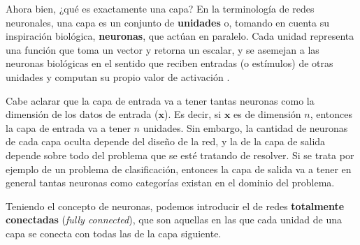 \documentclass[../../main.tex]{subfiles}
\begin{document}
Ahora bien, ¿qué es exactamente una capa? En la terminología de redes neuronales, una capa
es un conjunto de \textbf{unidades} o, tomando en cuenta su inspiración biológica,
\textbf{neuronas}, que actúan en paralelo. Cada unidad representa una función que toma un
vector y retorna un escalar, y se asemejan a las neuronas biológicas en el sentido que
reciben entradas (o estímulos) de otras unidades y computan su propio valor de activación
\cite{deep-learning}.

Cabe aclarar que la capa de entrada va a tener tantas neuronas como la dimensión de los
datos de entrada (\(\bm{x}\)). Es decir, si \(\bm{x}\) es de dimensión \(n\),
entonces la capa de entrada va a tener \(n\) unidades. Sin embargo, la cantidad de
neuronas de cada capa oculta depende del diseño de la red, y la de la capa de salida
depende sobre todo del problema que se esté tratando de resolver. Si se trata por ejemplo
de un problema de clasificación, entonces la capa de salida va a tener en general
tantas neuronas como categorías existan en el dominio del problema.

Teniendo el concepto de neuronas, podemos introducir el de redes \textbf{totalmente
conectadas} (\textit{fully connected}), que son aquellas en las que cada unidad de una
capa se conecta con todas las de la capa siguiente.
\end{document}
